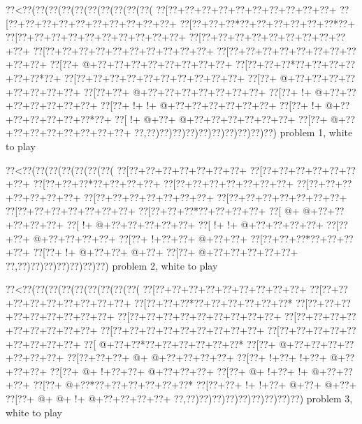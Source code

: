 \vbox{\vbox{\goo
\0??<\0??(\0??(\0??(\0??(\0??(\0??(\0??(\0??(\0??(\0??(
\0??[\0??+\0??+\0??+\0??+\0??+\0??+\0??+\0??+\0??+\0??+
\0??[\0??+\0??+\0??+\0??+\0??+\0??+\0??+\0??+\0??+\0??+
\0??[\0??+\0??+\0??*\0??+\0??+\0??+\0??+\0??+\0??*\0??+
\0??[\0??+\0??+\0??+\0??+\0??+\0??+\0??+\0??+\0??+\0??+
\0??[\0??+\0??+\0??+\0??+\0??+\0??+\0??+\0??+\0??+\0??+
\0??[\0??+\0??+\0??+\0??+\0??+\0??+\0??+\0??+\0??+\0??+
\0??[\0??+\0??+\0??+\0??+\0??+\0??+\0??+\0??+\0??+\0??+
\0??[\0??+\- @+\0??+\0??+\0??+\0??+\0??+\0??+\0??+\0??+
\0??[\0??+\0??+\0??*\0??+\0??+\0??+\0??+\0??+\0??*\0??+
\0??[\0??+\0??+\0??+\0??+\0??+\0??+\0??+\0??+\0??+\0??+
\0??[\0??+\- @+\0??+\0??+\0??+\0??+\0??+\0??+\0??+\0??+
\0??[\0??+\0??+\- @+\0??+\0??+\0??+\0??+\0??+\0??+\0??+
\0??[\0??+\- !+\- @+\0??+\0??+\0??+\0??+\0??+\0??+\0??+
\0??[\0??+\- !+\- !+\- @+\0??+\0??+\0??+\0??+\0??+\0??+
\0??[\0??+\- !+\- @+\0??+\0??+\0??+\0??+\0??+\0??*\0??+
\0??[\- !+\- @+\0??+\- @+\0??+\0??+\0??+\0??+\0??+\0??+
\0??[\0??+\- @+\0??+\0??+\0??+\0??+\0??+\0??+\0??+\0??+
\0??,\0??)\0??)\0??)\0??)\0??)\0??)\0??)\0??)\0??)\0??)
}
\hfil problem 1, white to play\hfil\break
}

\vbox{\vbox{\goo
\0??<\0??(\0??(\0??(\0??(\0??(\0??(\0??(
\0??[\0??+\0??+\0??+\0??+\0??+\0??+\0??+
\0??[\0??+\0??+\0??+\0??+\0??+\0??+\0??+
\0??[\0??+\0??+\0??*\0??+\0??+\0??+\0??+
\0??[\0??+\0??+\0??+\0??+\0??+\0??+\0??+
\0??[\0??+\0??+\0??+\0??+\0??+\0??+\0??+
\0??[\0??+\0??+\0??+\0??+\0??+\0??+\0??+
\0??[\0??+\0??+\0??+\0??+\0??+\0??+\0??+
\0??[\0??+\0??+\0??+\0??+\0??+\0??+\0??+
\0??[\0??+\0??+\0??*\0??+\0??+\0??+\0??+
\0??[\- @+\- @+\0??+\0??+\0??+\0??+\0??+
\0??[\- !+\- @+\0??+\0??+\0??+\0??+\0??+
\0??[\- !+\- !+\- @+\0??+\0??+\0??+\0??+
\0??[\0??+\0??+\- @+\0??+\0??+\0??+\0??+
\0??[\0??+\- !+\0??+\0??+\- @+\0??+\0??+
\0??[\0??+\0??+\0??*\0??+\0??+\0??+\0??+
\0??[\0??+\- !+\- @+\0??+\0??+\- @+\0??+
\0??[\0??+\- @+\0??+\0??+\0??+\0??+\0??+
\0??,\0??)\0??)\0??)\0??)\0??)\0??)\0??)
}
\hfil problem 2, white to play\hfil\break
}

\vbox{\vbox{\goo
\0??<\0??(\0??(\0??(\0??(\0??(\0??(\0??(\0??(\0??(
\0??[\0??+\0??+\0??+\0??+\0??+\0??+\0??+\0??+\0??+
\0??[\0??+\0??+\0??+\0??+\0??+\0??+\0??+\0??+\0??+
\0??[\0??+\0??+\0??*\0??+\0??+\0??+\0??+\0??+\0??*
\0??[\0??+\0??+\0??+\0??+\0??+\0??+\0??+\0??+\0??+
\0??[\0??+\0??+\0??+\0??+\0??+\0??+\0??+\0??+\0??+
\0??[\0??+\0??+\0??+\0??+\0??+\0??+\0??+\0??+\0??+
\0??[\0??+\0??+\0??+\0??+\0??+\0??+\0??+\0??+\0??+
\0??[\0??+\0??+\0??+\0??+\0??+\0??+\0??+\0??+\0??+
\0??[\- @+\0??+\0??*\0??+\0??+\0??+\0??+\0??+\0??*
\0??[\0??+\- @+\0??+\0??+\0??+\0??+\0??+\0??+\0??+
\0??[\0??+\0??+\0??+\- @+\- @+\0??+\0??+\0??+\0??+
\0??[\0??+\- !+\0??+\- !+\0??+\- @+\0??+\0??+\0??+
\0??[\0??+\- @+\- !+\0??+\0??+\- @+\0??+\0??+\0??+
\0??[\0??+\- @+\- !+\0??+\- !+\- @+\0??+\0??+\0??+
\0??[\0??+\- @+\0??*\0??+\0??+\0??+\0??+\0??+\0??*
\0??[\0??+\0??+\- !+\- !+\0??+\- @+\0??+\- @+\0??+
\0??[\0??+\- @+\- @+\- !+\- @+\0??+\0??+\0??+\0??+
\0??,\0??)\0??)\0??)\0??)\0??)\0??)\0??)\0??)\0??)
}
\hfil problem 3, white to play\hfil\break
}

